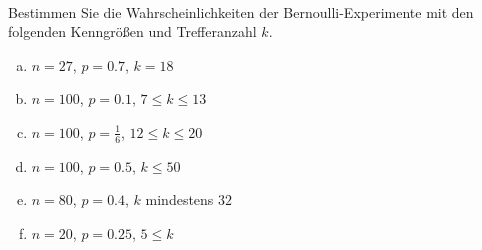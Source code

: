 \begin{aufgabe} ~ \\ 
Bestimmen Sie die Wahrscheinlichkeiten der Bernoulli-Experimente mit den folgenden Kenngrößen und Trefferanzahl $k$.\begin{multicols}{2} 
\begin{enumerate}[a)] 
\item 
$n=27$, $p=0.7$, $k=18$
\item 
$n=100$, $p=0.1$, $7\leq k \leq 13$
\item 
$n=100$, $p=\frac{1}{6}$, $12\leq k \leq 20$
\item 
$n=100$, $p=0.5$, $k \leq 50$
\item 
$n=80$, $p=0.4$, $k$ mindestens $32$
\item 
$n=20$, $p=0.25$, $5\leq k $
\end{enumerate} 
\end{multicols} 
\end{aufgabe} 
